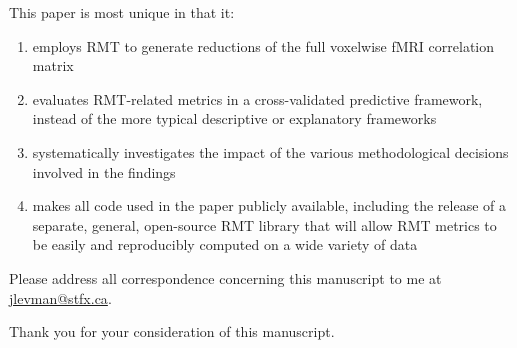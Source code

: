 \documentclass[10pt,a4paper]{article}
\begin{document}
This paper is most unique in that it:

\begin{enumerate}
  \item employs RMT to generate reductions of the full voxelwise fMRI
        correlation matrix
  \item evaluates RMT-related metrics in a cross-validated predictive
        framework, instead of the more typical descriptive or explanatory
        frameworks
  \item systematically investigates the impact of the various methodological
        decisions involved in the findings
  \item makes all code used in the paper publicly available, including the release of a
        separate, general, open-source RMT
        library \citep{dm-bergerStfxecutablesEmpyricalRMTV12022} that will allow
        RMT metrics to be easily and reproducibly computed on a wide variety of
        data
\end{enumerate}

Please address all correspondence concerning this manuscript to me at \href{jlevman@stfx.ca}{jlevman@stfx.ca}.

Thank you for your consideration of this manuscript.







\end{document}
